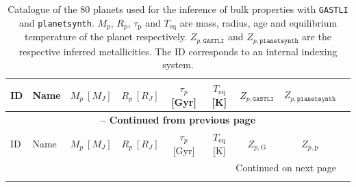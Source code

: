 \begin{longtable}{llccccccc}
\caption{Catalogue of the 80 planets used for the inference of bulk properties with \texttt{GASTLI} and \texttt{planetsynth}. $M_p$, $R_p$, $\tau_{\text{p}}$ and $T_{\text{eq}}$ are mass, radius, age and equilibrium temperature of the planet respectively. $Z_{p,\texttt{GASTLI}}$ and $Z_{p,\texttt{planetsynth}}$ are the respective inferred metallicities. The ID corresponds to an internal indexing system.} \\
\toprule
ID & Name & $M_p\: [M_J]$ & $R_p\: [R_J]$ & $\tau_p$ [Gyr] & $T_{\text{eq}}$ [K] & $Z_{p,\texttt{GASTLI}}$ & $Z_{p,\texttt{planetsynth}}$ \\
\midrule
\endfirsthead

\multicolumn{8}{c}{{\bfseries \tablename\ \thetable{} -- Continued from previous page}} \\
\toprule
ID & Name & $M_p\: [M_J]$ & $R_p\: [R_J]$ & $\tau_p$ [Gyr] & $T_{\text{eq}}$ [K] & $Z_{p,\text{G}}$ & $Z_{p,\text{p}}$ \\
\midrule
\endhead

\midrule
\multicolumn{8}{r}{{Continued on next page}} \\
\bottomrule
\endfoot

\bottomrule
\endlastfoot


\end{longtable}
